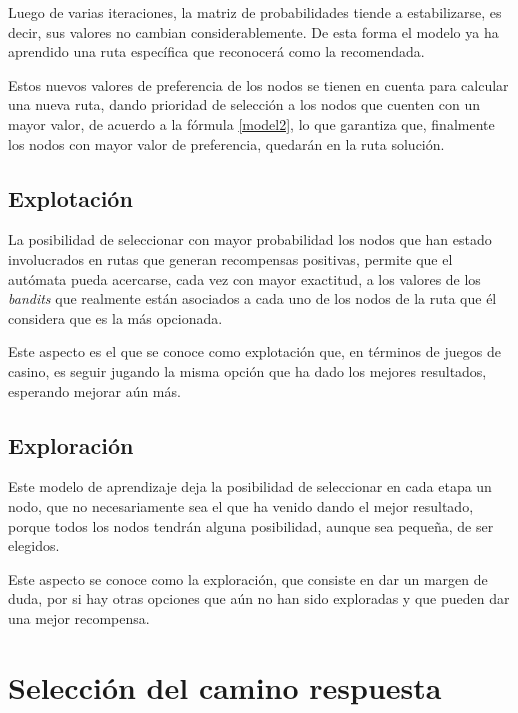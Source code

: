 
Luego de varias iteraciones, la matriz de probabilidades tiende a estabilizarse, es decir, sus valores no cambian considerablemente. De esta forma el modelo ya ha aprendido una ruta específica que reconocerá como la recomendada.

Estos nuevos valores de preferencia de los nodos se tienen en cuenta para calcular una nueva ruta, dando prioridad de selección a los nodos que cuenten con un mayor valor, de acuerdo a la fórmula \ref{model2}, lo que garantiza que, finalmente los nodos con mayor valor de preferencia, quedarán en la ruta solución.

\subsection{Explotación}
La posibilidad de seleccionar con mayor probabilidad los nodos que han estado involucrados en rutas que generan recompensas positivas, permite que el autómata pueda acercarse, cada vez con mayor exactitud, a los valores de los \textit{bandits} que realmente están asociados a cada uno de los nodos de la ruta que él considera que es la más opcionada.

Este aspecto es el que se conoce como explotación que, en términos de juegos de casino, es seguir jugando la misma opción que ha dado los mejores resultados, esperando mejorar aún más.

\subsection{Exploración}
Este modelo de aprendizaje deja la posibilidad de seleccionar en cada etapa un nodo, que no necesariamente sea el que ha venido dando el mejor resultado, porque todos los nodos tendrán alguna posibilidad, aunque sea pequeña, de ser elegidos.

Este aspecto se conoce como la exploración, que consiste en dar un margen de duda, por si hay otras opciones que aún no han sido exploradas y que pueden dar una mejor recompensa.

\section{Selección del camino respuesta}

